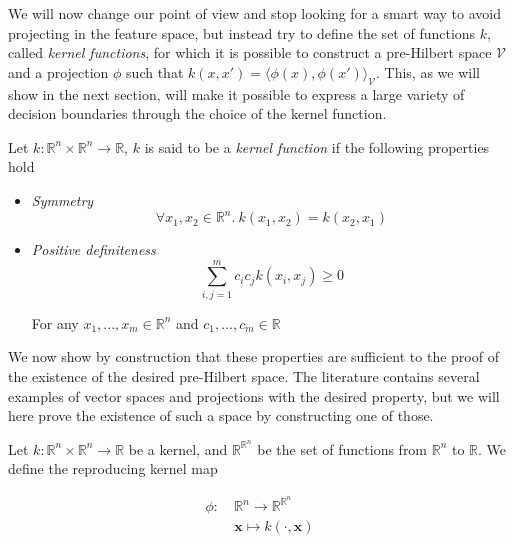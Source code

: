 We will now change our point of view and stop looking for a smart way to avoid projecting in the feature space, but instead try to define the set of functions $k$, called \textit{kernel functions}, for which it is possible to construct a pre-Hilbert space $\mathcal{V}$ and a projection $\phi$ such that $k(x, x') = \langle\phi(x), \phi(x')\rangle_{\mathcal{V}}$. This, as we will show in the next section, will make it possible to express a large variety of decision boundaries through the choice of the kernel function.

Let $k :\mathbb{R}^n \times \mathbb{R}^n \rightarrow \mathbb{R}$, $k$ is said to be a \textit{kernel function} if the following properties hold

\begin{itemize}
\item \textit{Symmetry}
  \begin{equation*}
    \forall x_1, x_2 \in \mathbb{R}^n.\ 
    k\left(x_1, x_2\right) = k\left(x_2, x_1\right)
  \end{equation*}

\item \textit{Positive definiteness}
  \begin{equation*}
    \sum_{i,j=1}^mc_ic_jk\left(x_i, x_j\right) \geq 0
  \end{equation*}

  For any $x_1, ..., x_m \in \mathbb{R}^n$ and $c_1, ..., c_m \in \mathbb{R}$  
\end{itemize}

We now show by construction that these properties are sufficient to the proof of the existence of the desired pre-Hilbert space. The literature contains several examples of vector spaces and projections with the desired property, but we will here prove the existence of such a space by constructing one of those.

Let $k : \mathbb{R}^n \times \mathbb{R}^n \rightarrow \mathbb{R}$ be a kernel, and $\mathbb{R}^{\mathbb{R}^n}$ be the set of functions from $\mathbb{R}^n$ to $\mathbb{R}$. We define the reproducing kernel map

\begin{equation}
  \begin{aligned}
    \phi :\ &\mathbb{R}^n \rightarrow \mathbb{R}^{\mathbb{R}^n}\\
    &\mathbf{x} \mapsto k(\cdot, \mathbf{x})
  \end{aligned}
\end{equation}

